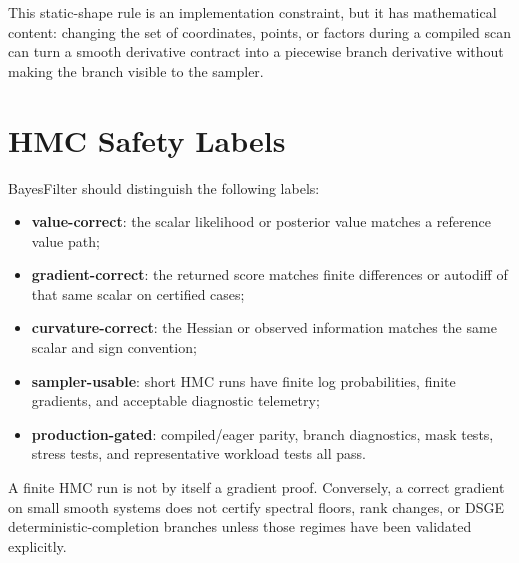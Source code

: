 This static-shape rule is an implementation constraint, but it has mathematical
content: changing the set of coordinates, points, or factors during a compiled
scan can turn a smooth derivative contract into a piecewise branch derivative
without making the branch visible to the sampler.

\section{HMC Safety Labels}
\label{sec:bf-custom-gradient-hmc-labels}

BayesFilter should distinguish the following labels:
\begin{itemize}
  \item \textbf{value-correct}: the scalar likelihood or posterior value matches
    a reference value path;
  \item \textbf{gradient-correct}: the returned score matches finite
    differences or autodiff of that same scalar on certified cases;
  \item \textbf{curvature-correct}: the Hessian or observed information matches
    the same scalar and sign convention;
  \item \textbf{sampler-usable}: short HMC runs have finite log probabilities,
    finite gradients, and acceptable diagnostic telemetry;
  \item \textbf{production-gated}: compiled/eager parity, branch diagnostics,
    mask tests, stress tests, and representative workload tests all pass.
\end{itemize}
A finite HMC run is not by itself a gradient proof.  Conversely, a correct
gradient on small smooth systems does not certify spectral floors, rank changes,
or DSGE deterministic-completion branches unless those regimes have been
validated explicitly.
